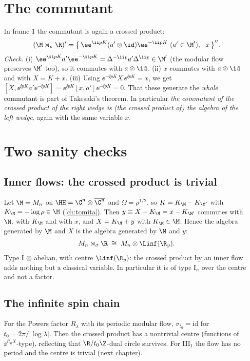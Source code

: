 \section{The commutant}

In frame 1 the commutant is again a crossed product:
\begin{equation}
(\M\rtimes_\sigma\R)'=\big\{\,\ee^{\ii pK}(a'\otimes\id)\ee^{-\ii pK}\ (a'\in\M'),\ \ x\,\big\}''.
\end{equation}
\emph{Check.} (i) $\ee^{\ii pK}a'\ee^{-\ii pK}=\Delta^{-\ii p}a'\Delta^{\ii p}\in\M'$ (the modular flow preserves $\M'$ too), so it commutes with $a\otimes\id$. (ii) $x$ commutes with $a\otimes\id$ and with $X=K+x$. (iii) Using $\ee^{-\ii pK}X\,\ee^{\ii pK}=x$, we get $[X,\ee^{\ii pK}a'\ee^{-\ii pK}]=\ee^{\ii pK}[x,a']\ee^{-\ii pK}=0$. That these generate the \emph{whole} commutant is part of Takesaki's theorem. In particular \emph{the commutant of the crossed product of the right wedge is (the crossed product of) the algebra of the left wedge}, again with the same variable $x$.

\section{Two sanity checks}

\subsection{Inner flows: the crossed product is trivial}
Let $\M=M_n$ on $\HH=\C^n\otimes\overline{\C^n}$ and $\Omega=\rho^{1/2}$, so $K=K_\M-K_{\M'}$ with $K_\M=-\log\rho\in\M$ (\cref{ch:tomita}). Then $y\equiv X-K_\M=x-K_{\M'}$ commutes with $\M$, with $K_\M$ and with $x$, and $X=K_\M+y$ with $K_\M\in\M$. Hence the algebra generated by $\M$ and $X$ is the algebra generated by $\M$ and $y$:
\begin{equation}
M_n\rtimes_{\sigma}\R\;\cong\;M_n\otimes\Linf(\R_y).
\end{equation}
Type I $\otimes$ abelian, with centre $\Linf(\R_y)$: the crossed product by an inner flow adds nothing but a classical variable. In particular it is of type I$_n$ over the centre and not a factor.

\subsection{The infinite spin chain}
For the Powers factor $R_\lambda$ with its periodic modular flow, $\sigma_{t_0}=\mathrm{id}$ for $t_0=2\pi/|\log\lambda|$. Then the crossed product has a nontrivial centre (functions of $\ee^{\ii t_0 X}$-type), reflecting that $\R/t_0\Z$-dual circle survives. For III$_1$ the flow has no period and the centre is trivial (next chapter).


